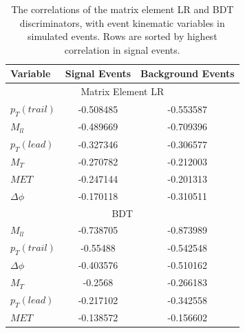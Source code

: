 \vspace{30pt}
\begin{table}[ht!]
\begin{center}
\begin{tabular}{l|c|c}
\hline
Variable        &   Signal Events   & Background Events \\ \hline
\hline
\multicolumn{3}{c}{Matrix Element LR} \\
\hline

$p_{T} (trail)$ &   -0.508485       &  -0.553587 \\
$M_{ll}$        &   -0.489669       &  -0.709396 \\
$p_{T} (lead)$  &   -0.327346       &  -0.306577 \\
$M_{T}$         &   -0.270782       &  -0.212003 \\
$MET$           &  -0.247144        &  -0.201313 \\
$\Delta\phi$    &   -0.170118       &  -0.310511  \\
\hline
\multicolumn{3}{c}{BDT} \\
\hline
$M_{ll}$        &  -0.738705       &  -0.873989 \\
$p_{T} (trail)$ &  -0.55488        &  -0.542548 \\
$\Delta\phi$    &  -0.403576       &  -0.510162  \\
$M_{T}$         &  -0.2568         &  -0.266183  \\
$p_{T} (lead)$  &  -0.217102       &  -0.342558 \\
$MET$           &  -0.138572       &  -0.156602 \\
\hline
\end{tabular}
\end{center}
\caption{ The correlations of the matrix element LR and BDT discriminators, with
event kinematic variables in simulated events.  Rows are sorted by highest correlation in signal events. }
\label{tab:bdt_me_correlations}
\end{table}

